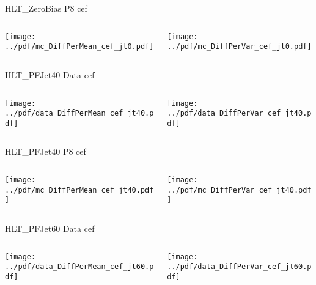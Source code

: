\documentclass[9pt]{beamer}
\begin{document}
\begin{frame}[t]{HLT\_ZeroBias P8 cef}
\begin{columns}[T]
  \begin{column}{.5\textwidth}
  \texttt{[image: ../pdf/mc\_DiffPerMean\_cef\_jt0.pdf]}
  \end{column}
  \begin{column}{.5\textwidth}
  \texttt{[image: ../pdf/mc\_DiffPerVar\_cef\_jt0.pdf]}
  \end{column}
\end{columns}
\end{frame}
\begin{frame}[t]{HLT\_PFJet40 Data cef}
\begin{columns}[T]
  \begin{column}{.5\textwidth}
  \texttt{[image: ../pdf/data\_DiffPerMean\_cef\_jt40.pdf]}
  \end{column}
  \begin{column}{.5\textwidth}
  \texttt{[image: ../pdf/data\_DiffPerVar\_cef\_jt40.pdf]}
  \end{column}
\end{columns}
\end{frame}

\begin{frame}[t]{HLT\_PFJet40 P8 cef}
\begin{columns}[T]
  \begin{column}{.5\textwidth}
  \texttt{[image: ../pdf/mc\_DiffPerMean\_cef\_jt40.pdf]}
  \end{column}
  \begin{column}{.5\textwidth}
  \texttt{[image: ../pdf/mc\_DiffPerVar\_cef\_jt40.pdf]}
  \end{column}
\end{columns}
\end{frame}

\begin{frame}[t]{HLT\_PFJet60 Data cef}
\begin{columns}[T]
  \begin{column}{.5\textwidth}
  \texttt{[image: ../pdf/data\_DiffPerMean\_cef\_jt60.pdf]}
  \end{column}
  \begin{column}{.5\textwidth}
  \texttt{[image: ../pdf/data\_DiffPerVar\_cef\_jt60.pdf]}
  \end{column}
\end{columns}
\end{frame}
\end{document}
